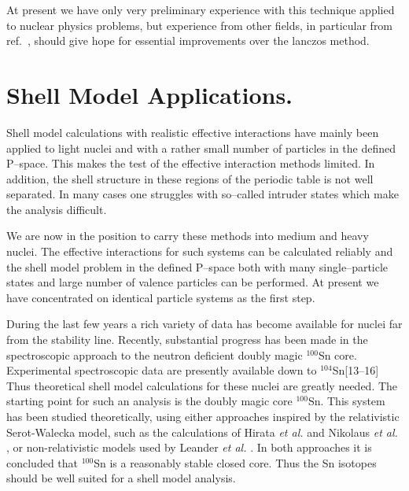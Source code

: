 %
At present we have only very preliminary experience with
this technique applied to nuclear physics problems, but experience
from other fields, in particular from ref.~\cite{ols90}, should
give hope for essential improvements over the lanczos
method.
%
%
%
 \section{Shell Model Applications.}
 Shell model calculations with realistic effective interactions
 have mainly been applied to light nuclei
 and with a rather small number of particles in the defined P--space.
 This makes the test of the effective interaction methods limited.
 In addition, the shell structure in these regions of the periodic table is
 not well separated. In many cases one struggles with so--called
 intruder states which make the analysis difficult.

 We are now in the position to carry these methods into medium and
 heavy nuclei. The effective interactions for such systems can be
 calculated reliably and  the shell model problem in the defined
 P--space both with many single--particle states and
 large number of  valence particles can be performed.  At present we
 have concentrated on identical particle systems as the first step.

 During the last few years a  rich
 variety of data has become available for nuclei far from the stability line.
 Recently, substantial progress has been made in the spectroscopic approach
 to the neutron deficient doubly magic $^{100}$Sn core. Experimental
 spectroscopic data are presently available down to $^{104}$Sn[13--16]
 Thus theoretical shell model calculations for these nuclei
 are greatly needed. The starting point for such an analysis is the doubly
 magic core $^{100}$Sn. This system has been studied theoretically, using
 either approaches inspired by the relativistic Serot-Walecka \cite{sw86}
 model, such as the calculations of Hirata {\em et al.} \cite{hir91}
 and Nikolaus {\em et al.} \cite{nhm92}, or non-relativistic
 models used by Leander {\em et al.} \cite{lean84}. In both approaches it
 is concluded that $^{100}$Sn is a reasonably stable closed core.
 Thus the Sn isotopes should be well suited for a shell model
 analysis.

